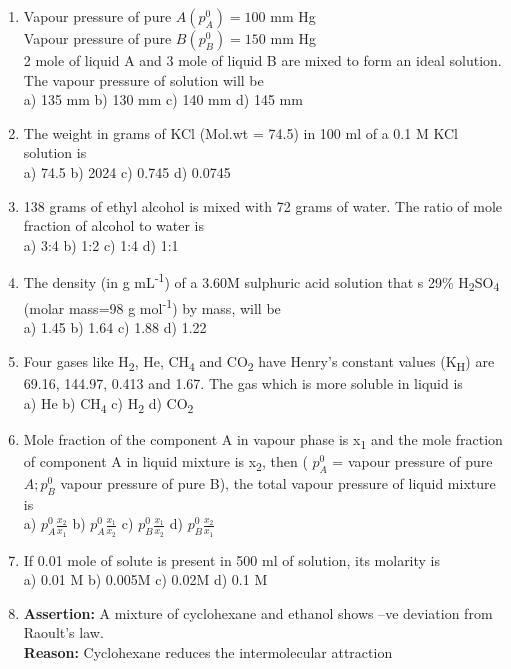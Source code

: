 \begin{enumerate}
\item
  Vapour pressure of pure \(A\left( p_{A}^{0} \right) = 100\) mm Hg\\
  Vapour pressure of pure \(B\left( p_{B}^{0} \right) = 150\) mm Hg\\
  2 mole of liquid A and 3 mole of liquid B are mixed to form an ideal
  solution. The vapour pressure of solution will be\\
  a) 135 mm b) 130 mm c) 140 mm d) 145 mm
\item
  The weight in grams of KCl (Mol.wt = 74.5) in 100 ml of a 0.1 M KCl
  solution is\\
  a) 74.5 b) 2024 c) 0.745 d) 0.0745
\item
  138 grams of ethyl alcohol is mixed with 72 grams of water. The ratio
  of mole fraction of alcohol to water is\\
  a) 3:4 b) 1:2 c) 1:4 d) 1:1
\item
  The density (in g mL\textsuperscript{-1}) of a 3.60M sulphuric acid
  solution that s 29\% H\textsubscript{2}SO\textsubscript{4} (molar
  mass=98 g mol\textsuperscript{-1}) by mass, will be\\
  a) 1.45 b) 1.64 c) 1.88 d) 1.22
\item
  Four gases like H\textsubscript{2}, He, CH\textsubscript{4} and
  CO\textsubscript{2} have Henry's constant values (K\textsubscript{H})
  are 69.16, 144.97, 0.413 and 1.67. The gas which is more soluble in
  liquid is\\
  a) He b) CH\textsubscript{4} c) H\textsubscript{2} d)
  CO\textsubscript{2}
\item
  Mole fraction of the component A in vapour phase is x\textsubscript{1}
  and the mole fraction of component A in liquid mixture is
  x\textsubscript{2}, then ( \(p_{A}^{0}\) = vapour pressure of pure
  \(A;p_{B}^{0}\) vapour pressure of pure B), the total vapour pressure
  of liquid mixture is\\
  a) \(p_{A}^{0}\frac{x_{2}}{x_{1}}\) b)
  \(p_{A}^{0}\frac{x_{1}}{x_{2}}\) c) \(p_{B}^{0}\frac{x_{1}}{x_{2}}\)
  d) \(p_{B}^{0}\frac{x_{2}}{x_{1}}\)
\item
  If 0.01 mole of solute is present in 500 ml of solution, its molarity
  is\\
  a) 0.01 M b) 0.005M c) 0.02M d) 0.1 M
\item
  \textbf{Assertion:} A mixture of cyclohexane and ethanol shows --ve
  deviation from Raoult's law.\\
  \textbf{Reason:} Cyclohexane reduces the intermolecular attraction

\end{enumerate}

